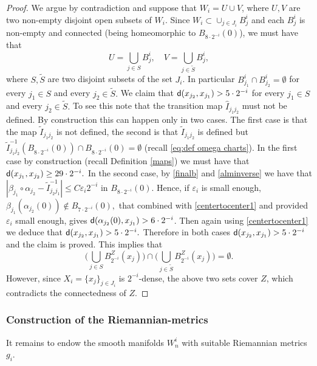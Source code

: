 \documentclass[11pt]{article}
\newcommand{\eps}{\varepsilon}
\newcommand{\sfd}{{\sf d}}
\theoremstyle{plain}
\theoremstyle{definition}
\numberwithin{equation}{section}
\begin{document}
\begin{proof}
	We argue by contradiction and suppose that $W_i=U\cup V$, where  $U,V$ are two non-empty disjoint open subsets of $W_i$.  Since $W_i\subset \cup_{j \in J_i} B_j^i$ and each $B_j^i$ is non-empty and connected (being homeomorphic to $B_{8\cdot 2^{-i}}(0)$),  we must have that 
	\begin{equation}\label{conncomp}
		U=\bigcup_{j\in S} B_j^i, \quad V=\bigcup_{j\in \tilde S} B_j^i,
	\end{equation}
	where $S,\tilde S$ are two disjoint subsets of the  set $J_i$. In particular $B_{j_1}^i\cap B_{j_2}^i=\emptyset $ for every $j_1 \in S$ and every $j_2\in \tilde S.$ We claim that $\sfd(x_{j_2},x_{j_1})>5\cdot 2^{-i}$ for every $j_1 \in S$ and every $j_2\in \tilde S.$ To see this note that the transition map $\hat I_{j_1j_2}$ must not be defined. By construction this can happen only in two cases. The first case is that the map $\tilde I_{j_1j_2}$ is not defined, the second is that $\tilde I_{j_1j_2}$ is defined but $\tilde I_{j_1j_2}^{-1}(B_{8\cdot 2^{-i}}(0))\cap B_{8\cdot 2^{-i}}(0) =\emptyset$ (recall \eqref{eq:def omega charts}). In the first case by construction (recall Definition \ref{maps}) we must have that $\sfd(x_{j_1},x_{j_2})\ge 29\cdot 2^{-i}.$ In the second case, by \eqref{finalb} and \eqref{alminverse} we have that $|\beta_{j_1} \circ \alpha_{j_2}-\tilde I_{j_2j_1}^{-1}|\le C\eps_i 2^{-i}$  in $B_{8\cdot2^{-i}}(0)$. Hence, if $\eps_i$ is small enough, $\beta_{j_1}( \alpha_{j_2}(0))\notin B_{7\cdot 2^{-i}}(0),$ that combined with \eqref{centertocenter1} and provided $\eps_i$ small enough, gives $\sfd(\alpha_{j_2}(0),x_{j_1})>6\cdot 2^{-i}$. Then again using \eqref{centertocenter1} we deduce that $\sfd(x_{j_2},x_{j_1})>5\cdot 2^{-i}.$ Therefore in both cases $\sfd(x_{j_2},x_{j_1})>5\cdot 2^{-i}$ and the claim is proved. This implies that
	\[\bigg(\bigcup_{j \in S} B^Z_{2^{-i}}(x_{j})\bigg)\cap \bigg(\bigcup_{j \in \tilde S} B^Z_{2^{-i}}(x_{j})\bigg)=\emptyset.\]
	However, since $X_i=\{x_{j}\}_{j\in J_i}$ is $2^{-i}$-dense, the above two sets cover $Z$, which contradicts the connectedness of $Z$.
\end{proof}

\subsubsection{Construction of the Riemannian-metrics}\label{sec:build metric}
It remains to endow the smooth manifolds $W_n^i$ with suitable Riemannian metrics $g_i$.
\end{document}
